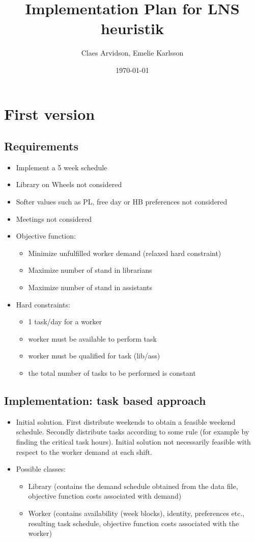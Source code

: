 \documentclass{article}
\title{Implementation Plan for LNS heuristik}
\author{Claes Arvidson, Emelie Karlsson}
\date{\today}
\begin{document}
 
\maketitle
 
\section*{First version }
	\subsection*{Requirements}
	\begin{itemize}
	\item Implement a 5 week schedule
	\item Library on Wheels not considered
	\item Softer values such as PL, free day or HB preferences not considered
	\item Meetings not considered
	\item Objective function:
		\begin{itemize}
		\item Minimize unfulfilled worker demand (relaxed hard constraint)
		\item Maximize number of stand in librarians
		\item Maximize number of stand in assistants
		\end{itemize}
	\item Hard constraints:
		\begin{itemize}
		\item 1 task/day for a worker
		\item worker must be available to perform task
		\item worker must be qualified for task (lib/ass)
		\item the total number of tasks to be performed is constant
		\end{itemize} 
	\end{itemize}
	\subsection*{Implementation: task based approach} 
	\begin{itemize}
	\item Initial solution. First distribute weekends to obtain a feasible weekend schedule. Secondly distribute tasks according to some rule (for example by finding  the critical task hours). Initial solution not necessarily feasible with respect to the worker demand at each shift.
	\item Possible classes:
		\begin{itemize}
		\item Library (contains the demand schedule obtained from the data file, objective function costs associated with demand)
		\item Worker (contains availability (week blocks), identity, preferences etc., resulting task schedule, objective function costs associated with the worker)
		\end{itemize}
	\end{itemize}
\end{document}
